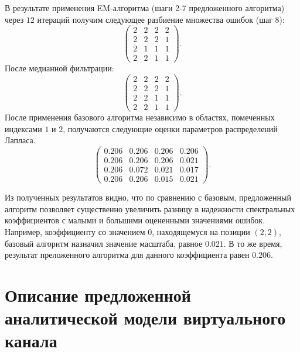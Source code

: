В результате применения EM-алгоритма (шаги 2-7 предложенного алгоритма) через $12$ итераций получим следующее разбиение множества ошибок (шаг 8):
\begin{equation*}
    \left(
    \begin{matrix}
        2  & 2 & 2 & 2 \\
        2  & 2 & 2 & 1 \\
        2  & 1 & 1 & 1 \\
        2  & 2 & 1 & 1
    \end{matrix}
    \right).
\end{equation*}
После медианной фильтрации:
\begin{equation*}
    \left(
    \begin{matrix}
        2  & 2 & 2 & 2 \\
        2  & 2 & 2 & 1 \\
        2  & 2 & 1 & 1 \\
        2  & 2 & 1 & 1
    \end{matrix}
    \right).
\end{equation*}
После применения базового алгоритма независимо в областях, помеченных индексами $1$ и $2$, получаются следующие оценки параметров распределений Лапласа.
\begin{equation*}
    \left(
    \begin{matrix}
        0.206  & 0.206 & 0.206 & 0.206 \\
        0.206  & 0.206 & 0.206 & 0.021 \\
        0.206  & 0.072 & 0.021 & 0.017 \\
        0.206  & 0.206 & 0.015 & 0.021
    \end{matrix}
    \right).
\end{equation*}

Из полученных результатов видно, что по сравнению с базовым, предложенный алгоритм позволяет существенно увеличить разницу в надежности спектральных коэффициентов с малыми и большими оцененными значениями ошибок. Например, коэффициенту со значением $0$, находящемуся на позиции $(2,2)$, базовый алгоритм назначил значение масштаба, равное $0.021$. В то же время, результат преложенного алгоритма для данного коэффициента равен $0.206$.

\section{Описание предложенной аналитической модели виртуального канала}
\label{chap:CNM:ProposedModel}

